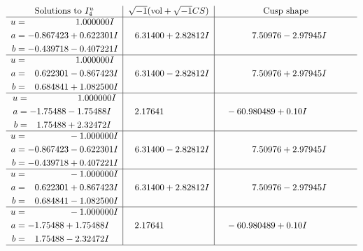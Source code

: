 \documentclass[1p]{elsarticle_modified}
\theoremstyle{definition}
\newcommand{\I}{\sqrt{-1}}
\begin{document}
$$\begin{array}{c|c|c}  
\text{Solutions to }I^u_{4}& \I (\text{vol} + \sqrt{-1}CS) & \text{Cusp shape}\\
 \hline 
\begin{aligned}
u &= \phantom{-0.000000 -}1.000000 I \\
a &= -0.867423 + 0.622301 I \\
b &= -0.439718 - 0.407221 I\end{aligned}
 & \phantom{-}6.31400 + 2.82812 I & \phantom{-}7.50976 - 2.97945 I \\ \hline\begin{aligned}
u &= \phantom{-0.000000 -}1.000000 I \\
a &= \phantom{-}0.622301 - 0.867423 I \\
b &= \phantom{-}0.684841 + 1.082500 I\end{aligned}
 & \phantom{-}6.31400 - 2.82812 I & \phantom{-}7.50976 + 2.97945 I \\ \hline\begin{aligned}
u &= \phantom{-0.000000 -}1.000000 I \\
a &= -1.75488 - 1.75488 I \\
b &= \phantom{-}1.75488 + 2.32472 I\end{aligned}
 & \phantom{-}2.17641\phantom{ +0.000000I} & \phantom{-}                -6
0.980489 + 0. 10   I\phantom{ +0.000000I} \\ \hline\begin{aligned}
u &= \phantom{-0.000000 } -1.000000 I \\
a &= -0.867423 - 0.622301 I \\
b &= -0.439718 + 0.407221 I\end{aligned}
 & \phantom{-}6.31400 - 2.82812 I & \phantom{-}7.50976 + 2.97945 I \\ \hline\begin{aligned}
u &= \phantom{-0.000000 } -1.000000 I \\
a &= \phantom{-}0.622301 + 0.867423 I \\
b &= \phantom{-}0.684841 - 1.082500 I\end{aligned}
 & \phantom{-}6.31400 + 2.82812 I & \phantom{-}7.50976 - 2.97945 I \\ \hline\begin{aligned}
u &= \phantom{-0.000000 } -1.000000 I \\
a &= -1.75488 + 1.75488 I \\
b &= \phantom{-}1.75488 - 2.32472 I\end{aligned}
 & \phantom{-}2.17641\phantom{ +0.000000I} & \phantom{-}                -6
0.980489 + 0. 10   I\phantom{ +0.000000I}\\
 \hline 
 \end{array}$$\newpage\newpage\renewcommand{\arraystretch}{1}
\end{document}
